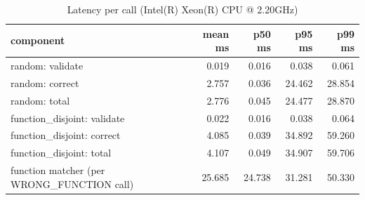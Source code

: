 \begin{table}[t]
\centering
\caption{Latency per call (Intel(R) Xeon(R) CPU @ 2.20GHz)}
\label{tab:runtime}
\begin{tabular}{lrrrr}
\hline
component & mean ms & p50 ms & p95 ms & p99 ms \\
\hline
random: validate & 0.019 & 0.016 & 0.038 & 0.061 \\
random: correct & 2.757 & 0.036 & 24.462 & 28.854 \\
random: total & 2.776 & 0.045 & 24.477 & 28.870 \\
function\_disjoint: validate & 0.022 & 0.016 & 0.038 & 0.064 \\
function\_disjoint: correct & 4.085 & 0.039 & 34.892 & 59.260 \\
function\_disjoint: total & 4.107 & 0.049 & 34.907 & 59.706 \\
function matcher (per WRONG\_FUNCTION call) & 25.685 & 24.738 & 31.281 & 50.330 \\
\hline
\end{tabular}
\end{table}
